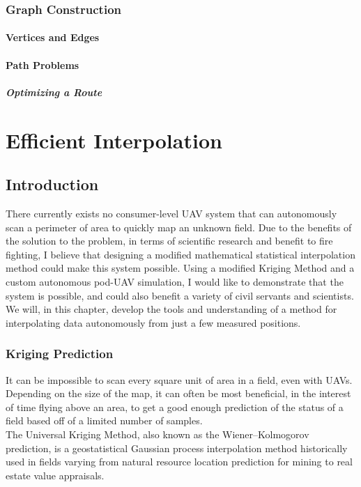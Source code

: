 \documentclass[11pt]{ucthesis}
\begin{document}
\section{Graph Construction}
\subsection{Vertices and Edges}
\subsection{Path Problems}
\subsubsection{Optimizing a Route}

\part{Efficient Interpolation}

\chapter{Introduction}
There currently exists no consumer-level UAV system that can autonomously scan a perimeter of area to quickly map an unknown field. Due to the benefits of the solution to the problem, in terms of scientific research and benefit to fire fighting, I believe that designing a modified mathematical statistical interpolation method could make this system possible. Using a modified Kriging Method and a custom autonomous pod-UAV simulation, I would like to demonstrate that the system is possible, and could also benefit a variety of civil servants and scientists. We will, in this chapter, develop the tools and understanding of a method for interpolating data autonomously from just a few measured positions.

\section{Kriging Prediction}
It can be impossible to scan every square unit of area in a field, even with UAVs. Depending on the size of the map, it can often be most beneficial, in the interest of time flying above an area, to get a good enough prediction of the status of a field based off of a limited number of samples.\\
The Universal Kriging Method, also known as the Wiener–Kolmogorov prediction, is a geostatistical Gaussian process interpolation method historically used in fields varying from natural resource location prediction for mining to real estate value appraisals.\\
\end{document}
